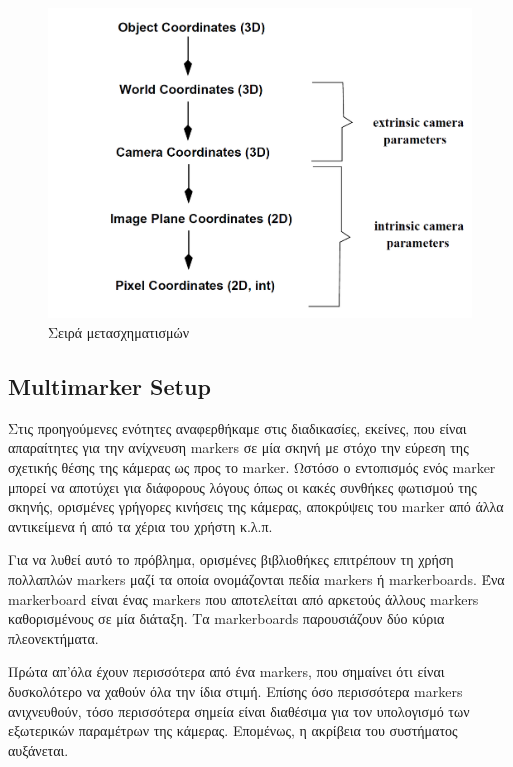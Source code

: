 \begin{figure}[H]
    \centering
    \includegraphics[scale=0.7, angle=0]{Files/Figures/coordinatesDiagram.png}
    \caption[Σειρά μετασχηματισμών]{ Σειρά μετασχηματισμών}
    \label{fig:coordinatesDiagram}
\end{figure}



\subsection{Multimarker Setup}




Στις προηγούμενες ενότητες αναφερθήκαμε στις διαδικασίες, εκείνες, που είναι απαραίτητες για την ανίχνευση markers σε μία σκηνή με στόχο την εύρεση της σχετικής θέσης της κάμερας ως προς το marker. Ωστόσο ο εντοπισμός ενός marker μπορεί να αποτύχει για διάφορους λόγους όπως οι κακές συνθήκες φωτισμού της σκηνής, ορισμένες γρήγορες κινήσεις της κάμερας, αποκρύψεις του marker από άλλα αντικείμενα ή από τα χέρια του χρήστη κ.λ.π. 



Για να λυθεί αυτό το πρόβλημα, ορισμένες βιβλιοθήκες επιτρέπουν τη χρήση πολλαπλών markers μαζί τα οποία ονομάζονται πεδία markers ή markerboards. Ένα markerboard είναι ένας markers που αποτελείται από αρκετούς άλλους markers καθορισμένους σε μία διάταξη. Τα markerboards παρουσιάζουν δύο κύρια πλεονεκτήματα. 

Πρώτα απ'όλα έχουν περισσότερα από ένα markers, που σημαίνει ότι είναι δυσκολότερο να χαθούν όλα την ίδια στιμή. Επίσης όσο περισσότερα markers ανιχνευθούν, τόσο περισσότερα σημεία είναι διαθέσιμα για τον υπολογισμό των εξωτερικών παραμέτρων της κάμερας.
Επομένως, η ακρίβεια του συστήματος αυξάνεται. 


